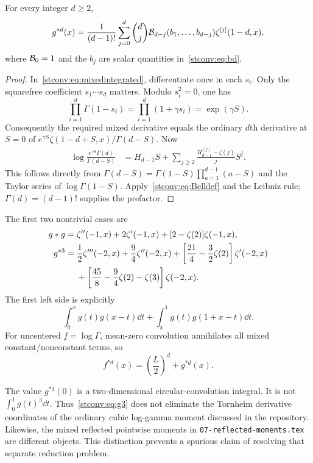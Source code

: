 \begin{theorem}\label{stconv:thm:gammapowers}
For every integer $d\ge2$,
\begin{equation}\label{stconv:eq:gammapowers}
 g^{*d}(x)=\frac1{(d-1)!}\sum_{j=0}^d\binom dj
       \mathcal B_{d-j}(b_1,\ldots,b_{d-j})\zeta^{[j]}(1-d,x),
\end{equation}
where $\mathcal B_0=1$ and the $b_j$ are scalar quantities in~\eqref{stconv:eq:bd}.
\end{theorem}
\begin{proof}
In~\eqref{stconv:eq:mixedintegrated}, differentiate once in each $s_i$.
Only the squarefree coefficient $s_1\cdots s_d$ matters. Modulo
$s_i^2=0$, one has
\[
 \prod_{i=1}^d\Gamma(1-s_i)
 =\prod_{i=1}^d(1+\gamma s_i)
 =\exp(\gamma S).
\]
Consequently the required mixed derivative equals the ordinary $d$th
derivative at $S=0$ of
$e^{\gamma S}\zeta(1-d+S,x)/\Gamma(d-S)$. Now
\begin{align*}
 \log\frac{e^{\gamma S}\Gamma(d)}{\Gamma(d-S)}
 &=H_{d-1}S+
   \sum_{j\ge2}\frac{H_{d-1}^{(j)}-\zeta(j)}jS^j.
\end{align*}
This follows directly from
$\Gamma(d-S)=\Gamma(1-S)\prod_{a=1}^{d-1}(a-S)$ and the Taylor series
of $\log\Gamma(1-S)$. Apply~\eqref{stconv:eq:Belldef} and the Leibniz rule;
$\Gamma(d)=(d-1)!$ supplies the prefactor.
\end{proof}

The first two nontrivial cases are
\begin{align}
 g*g={}&\zeta''(-1,x)+2\zeta'(-1,x)
                   +[2-\zeta(2)]\zeta(-1,x),\label{stconv:eq:g2}\\
 g^{*3}={}&\frac12\zeta'''(-2,x)+\frac94\zeta''(-2,x)
       +\left[\frac{21}4-\frac32\zeta(2)\right]\zeta'(-2,x)
       \label{stconv:eq:g3}\\
 &+\left[\frac{45}8-\frac94\zeta(2)-\zeta(3)\right]\zeta(-2,x).
 \notag
\end{align}
The first left side is explicitly
\[
 \int_0^xg(t)g(x-t)\dd t+\int_x^1g(t)g(1+x-t)\dd t.
\]
For uncentered $f=\log\Gamma$, mean-zero convolution annihilates all
mixed constant/nonconstant terms, so
\begin{equation}\label{stconv:eq:uncentered}
 f^{*d}(x)=\left(\frac L2\right)^d+g^{*d}(x).
\end{equation}

\begin{remark}
The value $g^{*3}(0)$ is a two-dimensional circular-convolution integral.
It is not $\int_0^1g(t)^3\dd t$. Thus~\eqref{stconv:eq:g3} does not eliminate
the Tornheim derivative coordinates of the ordinary cubic log-gamma
moment discussed in the repository. Likewise, the mixed reflected
pointwise moments in \texttt{07-reflected-moments.tex} are different
objects. This distinction prevents a spurious claim of resolving that
separate reduction problem.
\end{remark}
